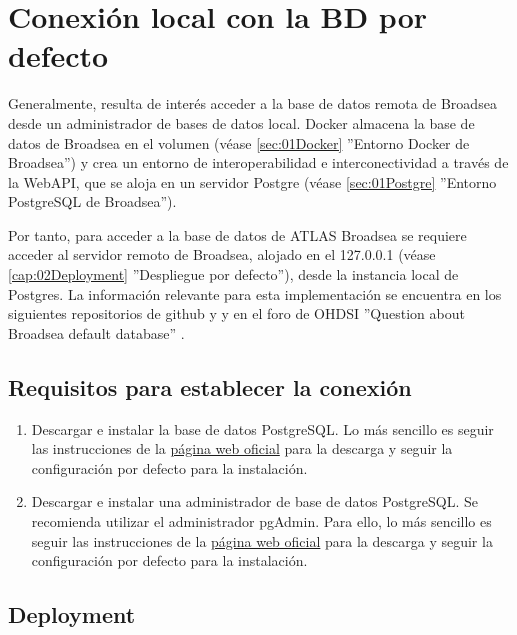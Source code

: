 \chapter{Conexión local con la BD por defecto} \label{cap:03ConexLocal}

Generalmente, resulta de interés acceder a la base de datos remota de Broadsea desde un administrador de bases de datos local.  Docker almacena la base de datos de Broadsea en el volumen  (véase \ref{sec:01Docker} ''Entorno Docker de Broadsea'') y crea un entorno de interoperabilidad e interconectividad a través de la WebAPI, que se aloja en un servidor Postgre (véase \ref{sec:01Postgre} ''Entorno PostgreSQL de Broadsea'').

Por tanto, para acceder a la base de datos de ATLAS Broadsea se requiere acceder al servidor remoto de Broadsea, alojado en el 127.0.0.1 (véase \ref{cap:02Deployment} ''Despliegue por defecto''), desde la instancia local de Postgres. La información relevante para esta implementación se encuentra en los siguientes repositorios de github \cite{githubBroadsea} y \cite{githubBroadseaDB} y en el foro de OHDSI ''Question about Broadsea default database'' \cite{forumBroadseaDB}.

\section{Requisitos para establecer la conexión} \label{sec:03requisitos}

\begin{enumerate}

    \item Descargar e instalar la base de datos PostgreSQL. Lo más sencillo es seguir las instrucciones de la \href{https://www.postgresql.org/download/}{página web oficial} para la descarga y seguir la configuración por defecto para la instalación.

    \item Descargar e instalar una administrador de base de datos PostgreSQL. Se recomienda utilizar el administrador pgAdmin. Para ello, lo más sencillo es seguir las instrucciones de la \href{https://www.pgadmin.org/download/}{página web oficial} para la descarga y seguir la configuración por defecto para la instalación.
    
\end{enumerate}

\section{Deployment} \label{sec:03Deployment}

